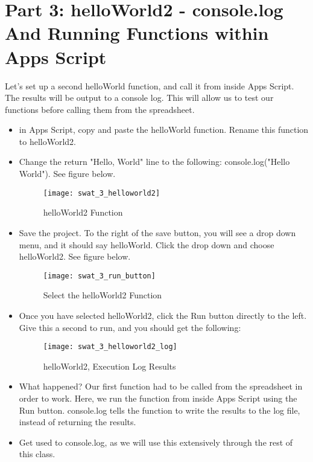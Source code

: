 \documentclass{article}
\begin{document}
\section*{Part 3: helloWorld2 - console.log And Running Functions within Apps Script}
Let's set up a second helloWorld function, and call it from inside Apps Script.  The results will be output to a console log.  This will allow us to test our functions before calling them from the spreadsheet.
\begin{itemize}
	\item in Apps Script, copy and paste the helloWorld function.  Rename this function to helloWorld2.
	\item Change the return "Hello, World" line to the following:  console.log("Hello World").  See figure below.
	\begin{figure}[H]
  		\centering
  		\texttt{[image: swat\_3\_helloworld2]}
  		\caption{helloWorld2 Function}
	\end{figure}
	\item Save the project.  To the right of the save button, you will see a drop down menu, and it should say helloWorld.  Click the drop down and choose helloWorld2.  See figure below.
	\begin{figure}[H]
  		\centering
  		\texttt{[image: swat\_3\_run\_button]}
  		\caption{Select the helloWorld2 Function}
	\end{figure}
	\item Once you have selected helloWorld2, click the Run button directly to the left.  Give this a second to run, and you should get the following:
	\begin{figure}[H]
  		\centering
  		\texttt{[image: swat\_3\_helloworld2\_log]}
  		\caption{helloWorld2, Execution Log Results}
	\end{figure}
	\item What happened?  Our first function had to be called from the spreadsheet in order to work.  Here, we run the function from inside Apps Script using the Run button.  console.log tells the function to write the results to the log file, instead of returning the results.  
	\item Get used to console.log, as we will use this extensively through the rest of this class.
\end{itemize}
\end{document}
